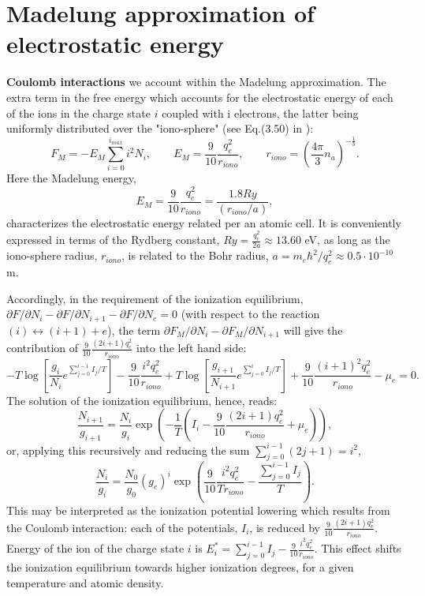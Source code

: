 \section{Madelung approximation of electrostatic energy}
{\bf Coulomb interactions} we account within the Madelung approximation. The extra term in the free energy which accounts for the
electrostatic energy of each of the ions in the charge state $i$ coupled with i electrons, the latter being uniformly
distributed over the "iono-sphere"
(see Eq.(3.50) in \cite{drake}):
\begin{equation}\label{fterm}
F_M=-E_M \sum_{i=0}^{i_{max}} i^2 N_i,\qquad E_M=\frac{9}{10} \frac{q_e^2}{r_{iono}},\qquad
r_{iono} = \left( \frac{4 \pi}{3} n_a \right)^{-\frac13}.
\end{equation}
Here the Madelung energy,
\begin{equation}
E_M=\frac9{10}\frac{q_e^2}{r_{iono}}=\frac{1.8Ry}{(r_{iono}/a)},
\end{equation}
characterizes the electrostatic energy related per an atomic cell. It is conveniently expressed in terms of the Rydberg constant,  $Ry=\frac{q_e^2}{2a}\approx 13.60$ eV, as long as
the iono-sphere radius, $r_{iono}$, is related to the Bohr radius, $a=m_e\hbar^2/q_e^2\approx0.5\cdot10^{-10}$ m.

Accordingly, in the requirement of the ionization equilibrium, $\partial F/\partial N_i - \partial F/\partial N_{i+1} - \partial F/\partial N_e = 0$ (with respect to the reaction $(i)\leftrightarrow(i+1)+e$),
the term $\partial F_{M}/\partial N_i -\partial F_{M}/\partial N_{i+1}$ will 
give the contribution of $\frac{9}{10} \frac{(2i+1)q_e^2}{r_{iono}}$ into the left hand side:
\begin{equation}
-T \log \left[ \frac{g_i}    {N_i}     e^{\sum_{j=0}^{i-1} I_j/T} \right] - \frac{9}{10} \frac{i^2     q_e^2}{r_{iono}}
+T \log \left[ \frac{g_{i+1}}{N_{i+1}} e^{\sum_{j=0}^i     I_j/T} \right] + \frac{9}{10} \frac{(i+1)^2 q_e^2}{r_{iono}}
-\mu_e = 0.
\end{equation}
The solution of the ionization equilibrium, hence, reads:
\begin{equation}
\frac{N_{i+1}}{g_{i+1}} = \frac{N_i}{g_i} \exp\left(-\frac1T \left(I_i - \frac{9}{10} \frac{(2i+1) q_e^2}{r_{iono}} + \mu_e \right)\right),
\end{equation}
or, applying this recursively and reducing the sum $\sum_{j=0}^{i-1} (2j+1) = i^2$,
\begin{equation}\label{pfM}
\frac{N_i}{g_i}=\frac{N_0}{g_0}(g_e)^i \exp \left( \frac{9}{10} \frac{i^2 q_e^2}{T r_{iono}} -\frac{\sum_{j=0}^{i-1}I_j}T \right) .
\end{equation}
This may be interpreted as the ionization potential lowering which results from the Coulomb interaction:
each of the potentials, $I_i$, is reduced by $\frac{9}{10} \frac{(2i+1)q_e^2}{r_{iono}}$.
Energy of the ion of the charge state $i$ is $E_i^* = \sum_{j=0}^{i-1}I_j - \frac{9}{10} \frac{i^2 q_e^2}{r_{iono}}$.
This effect shifts the ionization equilibrium towards higher ionization degrees, for a given temperature and atomic density.

